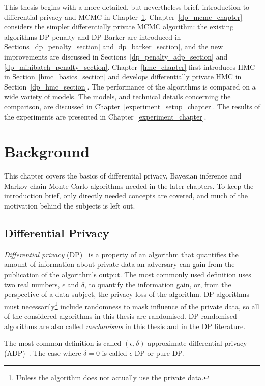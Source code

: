 \documentclass[english,twoside,openright]{HYgraduMLDS}
\begin{document}
This thesis begins with a more detailed, but nevertheless brief, introduction to
differential privacy and MCMC in Chapter~\ref{background_chapter}.
Chapter~\ref{dp_mcmc_chapter} considers the simpler differentially private
MCMC algorithm: the existing algorithms DP penalty and DP Barker are introduced
in Sections~\ref{dp_penalty_section} and \ref{dp_barker_section},
and the new improvements are discussed in Sections~\ref{dp_penalty_adp_section}
and \ref{dp_minibatch_penalty_section}. Chapter~\ref{hmc_chapter} first
introduces HMC in Section~\ref{hmc_basics_section} and develops differentially
private HMC in Section~\ref{dp_hmc_section}. The performance of the algorithms
is compared on a wide variety of models. The models, and technical details
concerning the comparison, are discussed in Chapter~\ref{experiment_setup_chapter}.
The results of the experiments are presented in Chapter~\ref{experiment_chapter}.

\chapter{Background}\label{background_chapter}

This chapter covers the basics of differential privacy, Bayesian inference
and Markov chain Monte Carlo algorithms needed in the later chapters. To keep
the introduction brief, only directly needed concepts are covered, and much
of the motivation behind the subjects is left out.

\section{Differential Privacy}\label{DP_background}
\emph{Differential privacy} (DP)~\cite{DMN06, DwR14} is a property of
an algorithm that quantifies the
amount of information about private data an adversary can gain from the 
publication of the algorithm's output.
The most commonly used definition uses two real numbers, 
\(\epsilon\) and \(\delta\), to quantify the information gain, or, from the 
perspective of a data subject, the privacy loss of the algorithm.
DP algorithms must necessarily\footnote{Unless the algorithm does not
actually use the private data.} include randomness to mask influence of the
private data, so all of the considered algorithms in this thesis are randomised.
DP randomised algorithms are also called \emph{mechanisms} in this thesis and in the
DP literature.

The most common definition is called \((\epsilon, \delta)\)-approximate
differential privacy (ADP)~\cite{DKM06, DwR14}.
The case where \(\delta = 0\) is called \(\epsilon\)-DP or 
pure DP.
\end{document}
